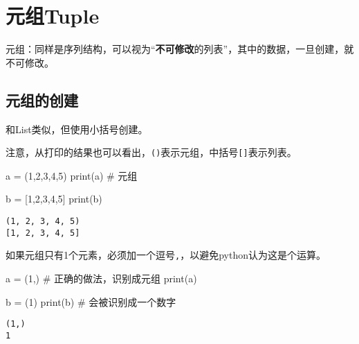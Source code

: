 \documentclass[
  letterpaper,
  DIV=11,
  numbers=noendperiod]{scrreprt}
\newenvironment{Shaded}{\begin{snugshade}}{\end{snugshade}}
\newcommand{\BuiltInTok}[1]{\textcolor[rgb]{0.00,0.23,0.31}{#1}}
\newcommand{\CommentTok}[1]{\textcolor[rgb]{0.37,0.37,0.37}{#1}}
\newcommand{\DecValTok}[1]{\textcolor[rgb]{0.68,0.00,0.00}{#1}}
\newcommand{\NormalTok}[1]{\textcolor[rgb]{0.00,0.23,0.31}{#1}}
\newcommand{\OperatorTok}[1]{\textcolor[rgb]{0.37,0.37,0.37}{#1}}
\begin{document}
\hypertarget{ux5143ux7ec4tuple}{%
\section{元组Tuple}\label{ux5143ux7ec4tuple}}

元组：同样是序列结构，可以视为``\textbf{不可修改}的列表''，其中的数据，一旦创建，就不可修改。

\hypertarget{ux5143ux7ec4ux7684ux521bux5efa}{%
\subsection{元组的创建}\label{ux5143ux7ec4ux7684ux521bux5efa}}

和List类似，但使用小括号创建。

注意，从打印的结果也可以看出，\texttt{()}表示元组，中括号\texttt{{[}{]}}表示列表。

\begin{Shaded}
\begin{Highlighting}[]
\NormalTok{a }\OperatorTok{=}\NormalTok{ (}\DecValTok{1}\NormalTok{,}\DecValTok{2}\NormalTok{,}\DecValTok{3}\NormalTok{,}\DecValTok{4}\NormalTok{,}\DecValTok{5}\NormalTok{) }
\BuiltInTok{print}\NormalTok{(a) }\CommentTok{\# 元组}

\NormalTok{b }\OperatorTok{=}\NormalTok{ [}\DecValTok{1}\NormalTok{,}\DecValTok{2}\NormalTok{,}\DecValTok{3}\NormalTok{,}\DecValTok{4}\NormalTok{,}\DecValTok{5}\NormalTok{]}
\BuiltInTok{print}\NormalTok{(b)}
\end{Highlighting}
\end{Shaded}

\begin{verbatim}
(1, 2, 3, 4, 5)
[1, 2, 3, 4, 5]
\end{verbatim}

如果元组只有1个元素，必须加一个逗号\texttt{,}，以避免python认为这是个运算。

\begin{Shaded}
\begin{Highlighting}[]
\NormalTok{a }\OperatorTok{=}\NormalTok{ (}\DecValTok{1}\NormalTok{,) }\CommentTok{\# 正确的做法，识别成元组}
\BuiltInTok{print}\NormalTok{(a)}

\NormalTok{b }\OperatorTok{=}\NormalTok{ (}\DecValTok{1}\NormalTok{)}
\BuiltInTok{print}\NormalTok{(b) }\CommentTok{\# 会被识别成一个数字}
\end{Highlighting}
\end{Shaded}

\begin{verbatim}
(1,)
1
\end{verbatim}
\end{document}
